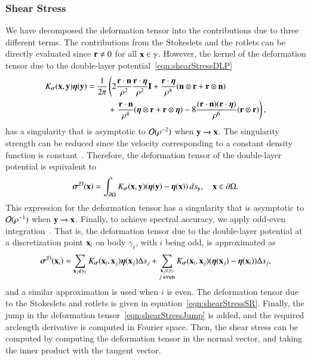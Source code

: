 \documentclass[preprint, 10pt]{elsarticle}
\begin{document}
\subsubsection{Shear Stress}
We have decomposed the deformation tensor into the contributions due to
three different terms.  The contributions from the Stokeslets and the
rotlets can be directly evaluated since ${\mathbf{r}} \neq 0$ for all ${\mathbf{x}} \in
\gamma$.  However, the kernel of the deformation tensor due to the
double-layer potential~\eqref{eqn:shearStressDLP} 
\begin{align*}
  K_{\boldsymbol\sigma}({\mathbf{x}},{\mathbf{y}}){\boldsymbol\eta}({\mathbf{y}}) &= \frac{1}{2\pi} \left(
    2\frac{{\mathbf{r}} \cdot {\mathbf{n}}}{\rho^2} \frac{{\mathbf{r}} \cdot {\boldsymbol\eta}}{\rho^2} {\mathbf{I}} + 
    \frac{{\mathbf{r}} \cdot {\boldsymbol\eta}}{\rho^4} ({\mathbf{n}} \otimes {\mathbf{r}} + {\mathbf{r}} \otimes {\mathbf{n}})
    \right. \\ & \hspace{25pt}+ \left.
    \frac{{\mathbf{r}} \cdot {\mathbf{n}}}{\rho^4} ({\boldsymbol\eta} \otimes {\mathbf{r}} + {\mathbf{r}} \otimes {\boldsymbol\eta}) - 
    8\frac{({\mathbf{r}} \cdot {\mathbf{n}})({\mathbf{r}} \cdot {\boldsymbol\eta})}{\rho^6}({\mathbf{r}} \otimes {\mathbf{r}})
  \right),
\end{align*}
has a singularity that is asymptotic to ${\mathcal{O}}(\rho^{-2})$ when ${\mathbf{y}}
\rightarrow {\mathbf{x}}$.  The singularity strength can be reduced since the
velocity corresponding to a constant density function is
constant~\cite{poz1992}.  Therefore, the deformation tensor of the
double-layer potential is equivalent to
\begin{align*}
  {\boldsymbol\sigma}^{{\mathcal{D}}}({\mathbf{x}}) = \int_{{\partial}\Omega}K_{\boldsymbol\sigma}({\mathbf{x}},{\mathbf{y}})
      ({\boldsymbol\eta}({\mathbf{y}}) - {\boldsymbol\eta}({\mathbf{x}})) \, ds_{{\mathbf{y}}}, \quad {\mathbf{x}} \in {\partial}\Omega.
\end{align*}
This expression for the deformation tensor has a singularity that is
asymptotic to ${\mathcal{O}}(\rho^{-1})$ when ${\mathbf{y}} \rightarrow {\mathbf{x}}$.  Finally,
to achieve spectral accuracy, we apply odd-even
integration~\cite{sid-isr1988}.  That is, the deformation tensor due to
the double-layer potential at a discretization point ${\mathbf{x}}_i$ on body
$\gamma_\ell$, with $i$ being odd, is approximated as
\begin{align}
  {\boldsymbol\sigma}^{{\mathcal{D}}}({\mathbf{x}}_i) = \sum_{{\mathbf{x}}_j \notin \gamma_\ell}
    K_{\boldsymbol\sigma}({\mathbf{x}}_i,{\mathbf{x}}_j) {\boldsymbol\eta}({\mathbf{x}}_j) \Delta s_j + 
  \sum_{\substack{{\mathbf{x}}_j \in \gamma_\ell \\ j \: \mathtt{even}}}
    K_{\boldsymbol\sigma}({\mathbf{x}}_i,{\mathbf{x}}_j) ({\boldsymbol\eta}({\mathbf{x}}_j) - {\boldsymbol\eta}({\mathbf{x}}_i)) \Delta s_j,
  \label{eqn:stressOddEven}
\end{align}
and a similar approximation is used when $i$ is even.  The deformation
tensor due to the Stokeslets and rotlets is given in
equation~\eqref{eqn:shearStressSR}.  Finally, the jump in the
deformation tensor~\eqref{eqn:shearStressJump} is added, and the
required arclength derivative is computed in Fourier space.  Then, the
shear stress can be computed by computing the deformation tensor in the
normal vector, and taking the inner product with the tangent vector.
\end{document}
